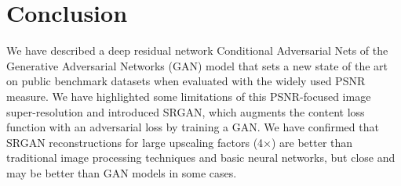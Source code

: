 \documentclass[12pt]{article}
\begin{document}
	\clearpage
	\section{Conclusion}
		We have described a deep residual network Conditional Adversarial Nets of the Generative Adversarial Networks (GAN) model that sets a new state of the art on public benchmark datasets when evaluated with the widely used PSNR measure. We have highlighted some limitations of this PSNR-focused image super-resolution and introduced SRGAN, which augments the content loss function with an adversarial loss by training a GAN. We have confirmed that SRGAN reconstructions for large upscaling factors (4×) are better than traditional image processing techniques and basic neural networks, but close and may be better than GAN models in some cases.
		
\end{document}
